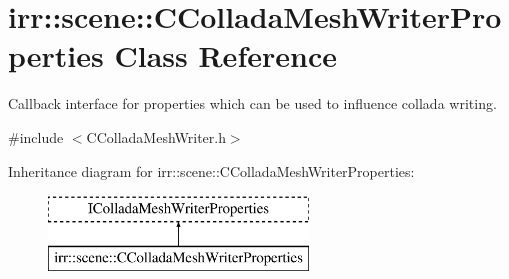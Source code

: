 \hypertarget{classirr_1_1scene_1_1_c_collada_mesh_writer_properties}{\section{irr\-:\-:scene\-:\-:C\-Collada\-Mesh\-Writer\-Properties Class Reference}
\label{classirr_1_1scene_1_1_c_collada_mesh_writer_properties}
}


Callback interface for properties which can be used to influence collada writing.  




{\ttfamily \#include $<$C\-Collada\-Mesh\-Writer.\-h$>$}

Inheritance diagram for irr\-:\-:scene\-:\-:C\-Collada\-Mesh\-Writer\-Properties\-:\begin{figure}[H]
\begin{center}
\leavevmode
\includegraphics[height=2.000000cm]{classirr_1_1scene_1_1_c_collada_mesh_writer_properties}
\end{center}
\end{figure}
